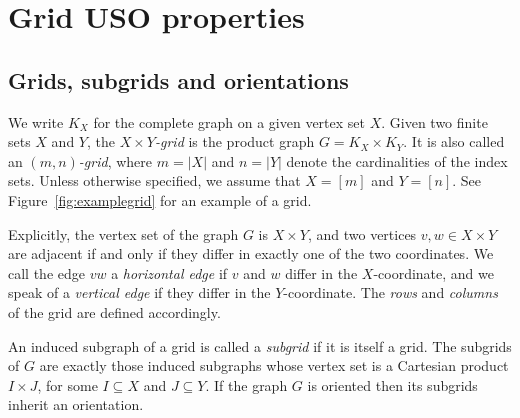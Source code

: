 \documentclass[a4paper,10pt]{article}
\begin{document}
\section{Grid USO properties}
\label{section:grid_uso_properties}

\subsection{Grids, subgrids and orientations}

We write $K_X$ for the complete graph on a given vertex set $X$.
Given two finite sets $X$ and $Y$,
the \emph{$X \times Y$-grid} is the product graph $G = K_X \times K_Y$.
It is also called an \emph{$(m,n)$-grid}, where $m = |X|$ and $n = |Y|$ denote
the cardinalities of the index sets.
Unless otherwise specified, we assume that $X = [m]$ and $Y = [n]$.
See Figure~\ref{fig:examplegrid} for an example of a grid.

Explicitly, the vertex set of the graph $G$ is $X \times Y$, and two
vertices $v,w \in X \times Y$ are adjacent if and only if they differ in
exactly one of the two coordinates.
We call the edge $vw$ a \emph{horizontal edge} if $v$ and $w$ differ in the
$X$-coordinate, and we speak of a \emph{vertical edge} if they differ in the
$Y$-coordinate. The \emph{rows} and \emph{columns} of the grid are defined accordingly.

An induced subgraph of a grid is called a \emph{subgrid} if it is itself a grid.
The subgrids of $G$ are exactly those induced subgraphs whose vertex set is a
Cartesian product $I \times J$, for some $I \subseteq X$ and $J \subseteq Y$.
If the graph $G$ is oriented then its subgrids inherit an orientation.
\end{document}
